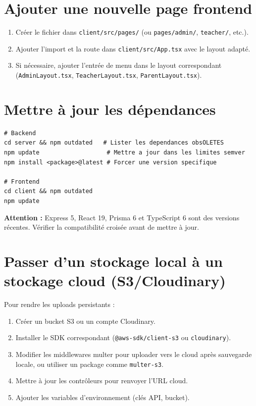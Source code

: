 \documentclass[12pt,a4paper]{report}
\begin{document}
\section{Ajouter une nouvelle page frontend}
\begin{enumerate}
    \item Créer le fichier dans \texttt{client/src/pages/} (ou \texttt{pages/admin/}, \texttt{teacher/}, etc.).
    \item Ajouter l'import et la route dans \texttt{client/src/App.tsx} avec le layout adapté.
    \item Si nécessaire, ajouter l'entrée de menu dans le layout correspondant (\texttt{AdminLayout.tsx}, \texttt{TeacherLayout.tsx}, \texttt{ParentLayout.tsx}).
\end{enumerate}

\section{Mettre à jour les dépendances}
\begin{lstlisting}
# Backend
cd server && npm outdated   # Lister les dependances obsOLETES
npm update                   # Mettre a jour dans les limites semver
npm install <package>@latest # Forcer une version specifique

# Frontend
cd client && npm outdated
npm update
\end{lstlisting}

\textbf{Attention :} Express 5, React 19, Prisma 6 et TypeScript 6 sont des versions récentes. Vérifier la compatibilité croisée avant de mettre à jour.

\section{Passer d'un stockage local à un stockage cloud (S3/Cloudinary)}

Pour rendre les uploads persistants :
\begin{enumerate}
    \item Créer un bucket S3 ou un compte Cloudinary.
    \item Installer le SDK correspondant (\texttt{@aws-sdk/client-s3} ou \texttt{cloudinary}).
    \item Modifier les middlewares multer pour uploader vers le cloud après sauvegarde locale, ou utiliser un package comme \texttt{multer-s3}.
    \item Mettre à jour les contrôleurs pour renvoyer l'URL cloud.
    \item Ajouter les variables d'environnement (clés API, bucket).
\end{enumerate}
\end{document}
